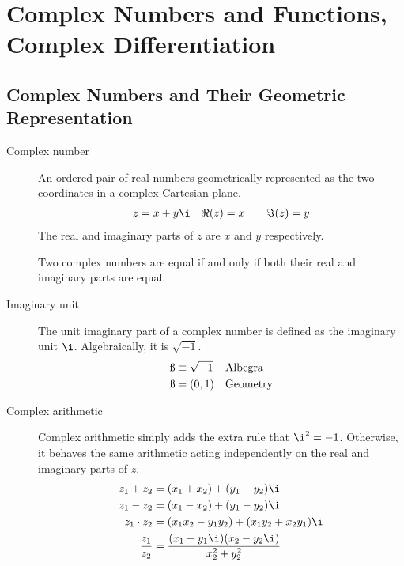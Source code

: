 \chapter{Complex Numbers and Functions, Complex Differentiation}

\section{Complex Numbers and Their Geometric Representation}

\begin{description}
    \item[Complex number] An ordered pair of real numbers geometrically represented
        as the two coordinates in a complex Cartesian plane.
        \begin{align}
            z & = x + y\i & \Re(z) = x \qquad \Im(z) = y
        \end{align}
        The real and imaginary parts of $ z $ are $ x $ and $ y $ respectively. \par
        Two complex numbers are equal if and only if both their real and imaginary
        parts are equal.

    \item[Imaginary unit] The unit imaginary part of a complex number is defined as
        the imaginary unit $ \i $. Algebraically, it is $ \sqrt{-1} $.
        \begin{align}
            \i & \equiv \sqrt{-1} &  & \text{Albegra}  \\
            \i & = (0, 1)         &  & \text{Geometry}
        \end{align}

    \item[Complex arithmetic] Complex arithmetic simply adds the extra rule that
        $ \i^2 = -1 $. Otherwise, it behaves the same arithmetic acting independently
        on the real and imaginary parts of $ z $.
        \begin{align}
            z_1 + z_2       & = (x_1 + x_2) + (y_1 + y_2) \i                       \\
            z_1 - z_2       & = (x_1 - x_2) + (y_1 - y_2) \i                       \\
            z_1 \cdot z_2   & = (x_1x_2 - y_1y_2) + (x_1y_2 + x_2y_1) \i           \\
            \frac{z_1}{z_2} & = \frac{(x_1 + y_1 \i)(x_2 - y_2 \i)}{x_2^2 + y_2^2}
        \end{align}


\end{description}
